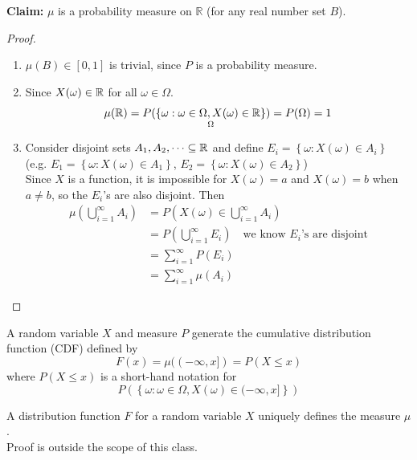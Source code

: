 \textbf{Claim:} $\mu$ is a probability measure on $\mathbb{R}$ (for any real number set $B$).
\begin{proof}
\begin{enumerate}
    \item $\mu(B) \in [0,1]$ is trivial, since $P$ is a probability measure.
    \item Since $X(\omega) \in \mathbb{R}$ for all $\omega \in \Omega$.
    \[\mu(\mathbb{R}) = P(\underset{\Omega}{ \left\{\omega : \omega \in \Omega, X(\omega)\in \mathbb{R}\right\} }) = P(\Omega) = 1\]
    \item Consider disjoint sets $A_1, A_2, \dots \subseteq \mathbb{R}$ and define $E_i = \left\{\omega: X(\omega) \in A_i\right\}$
    \\(e.g. $E_1 = \left\{\omega: X(\omega)\in A_1\right\}$, $E_2 = \left\{\omega: X(\omega)\in A_2\right\}$)
    \\Since $X$ is a function, it is impossible for $X(\omega) = a$ and $X(\omega) = b$ when $a\neq b$, so the $E_i$'s are also disjoint. Then
    \begin{align*}
        \mu\left(\bigcup_{i=1}^{\infty}A_i\right) &= P\left(X(\omega) \in \bigcup_{i=1}^{\infty}A_i\right) \\
        &= P\left(\bigcup_{i=1}^{\infty}E_i\right) \quad \text{we know } E_i\text{'s are disjoint} \\
        &= \sum_{i=1}^{\infty}P(E_i) \\
        &= \sum_{i=1}^{\infty}\mu(A_i)
    \end{align*}
\end{enumerate}
\end{proof}

\begin{definition}
    A random variable $X$ and measure $P$ generate the cumulative distribution function (CDF) defined by
    \[F(x) = \mu((-\infty, x]) = P(X \leq x)\]
    where $P(X\leq x)$ is a short-hand notation for
    \[P(\left\{\omega: \omega \in \Omega, X(\omega) \in (-\infty, x]\right\})\]
\end{definition}

\begin{theorem}[][3.3.1]
    A distribution function $F$ for a random variable $X$ uniquely defines the measure $\mu$.
    \\Proof is outside the scope of this class.
\end{theorem}

